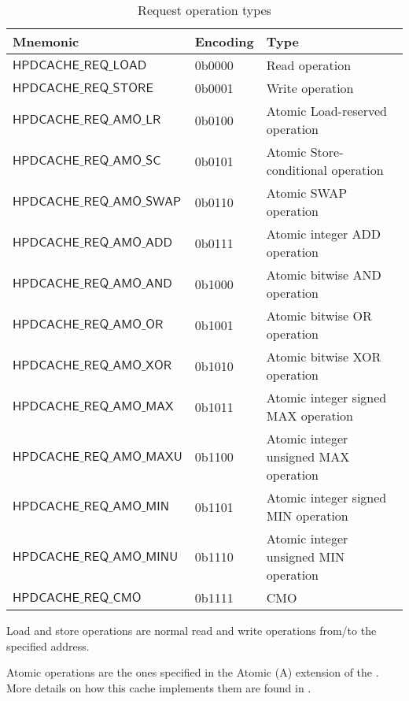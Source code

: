 \documentclass[10pt,titlepage,twoside]{book}
\begin{document}
\begin{table}[h!]
\begin{center}
\caption{Request operation types}%
{\footnotesize
\begin{tabular}{lll}
  \toprule
  \textbf{Mnemonic}
  & \textbf{Encoding}
  & \textbf{Type} \\
  \midrule
  $\mathsf{HPDCACHE\_REQ\_LOAD}$
  & 0b0000
  & Read operation \\
  \midrule
  $\mathsf{HPDCACHE\_REQ\_STORE}$
  & 0b0001
  & Write operation \\
  \midrule
  $\mathsf{HPDCACHE\_REQ\_AMO\_LR}$
  & 0b0100
  & Atomic Load-reserved operation \\
  \midrule
  $\mathsf{HPDCACHE\_REQ\_AMO\_SC}$
  & 0b0101
  & Atomic Store-conditional operation \\
  \midrule
  $\mathsf{HPDCACHE\_REQ\_AMO\_SWAP}$
  & 0b0110
  & Atomic SWAP operation \\
  \midrule
  $\mathsf{HPDCACHE\_REQ\_AMO\_ADD}$
  & 0b0111
  & Atomic integer ADD operation \\
  \midrule
  $\mathsf{HPDCACHE\_REQ\_AMO\_AND}$
  & 0b1000
  & Atomic bitwise AND operation \\
  \midrule
  $\mathsf{HPDCACHE\_REQ\_AMO\_OR}$
  & 0b1001
  & Atomic bitwise OR operation \\
  \midrule
  $\mathsf{HPDCACHE\_REQ\_AMO\_XOR}$
  & 0b1010
  & Atomic bitwise XOR operation \\
  \midrule
  $\mathsf{HPDCACHE\_REQ\_AMO\_MAX}$
  & 0b1011
  & Atomic integer signed MAX operation \\
  \midrule
  $\mathsf{HPDCACHE\_REQ\_AMO\_MAXU}$
  & 0b1100
  & Atomic integer unsigned MAX operation \\
  \midrule
  $\mathsf{HPDCACHE\_REQ\_AMO\_MIN}$
  & 0b1101
  & Atomic integer signed MIN operation \\
  \midrule
  $\mathsf{HPDCACHE\_REQ\_AMO\_MINU}$
  & 0b1110
  & Atomic integer unsigned MIN operation \\
  \midrule
  $\mathsf{HPDCACHE\_REQ\_CMO}$
  & 0b1111
  & \acf*{CMO} \\
\end{tabular}}
\end{center}
\end{table}

Load and store operations are normal read and write operations from/to the specified address.

Atomic operations are the ones specified in the Atomic (A) extension of the \cite{RISCV_spec}.
More details on how this cache implements them are found in .
\end{document}
